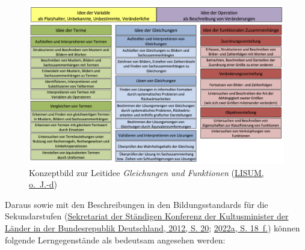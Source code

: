 \documentclass[
]{scrbook}
\theoremstyle{definition}
\theoremstyle{definition}
\theoremstyle{definition}
\theoremstyle{definition}
\theoremstyle{remark}
\begin{document}
\begin{figure}

{\centering \includegraphics[width=0.9\linewidth]{pictures/13-KonzeptFunktion} 

}

\caption{Konzeptbild zur Leitidee \emph{Gleichungen und Funktionen} (\protect\hyperlink{ref-LISUMd}{LISUM, o.~J.-d})}\label{fig:KonzeptFunktionen}
\end{figure}

Daraus sowie mit den Beschreibungen in den Bildungsstandards für die Sekundarstufen (\protect\hyperlink{ref-KMK:2012}{Sekretariat der Ständigen Konferenz der Kultusminister der Länder in der Bundesrepublik Deutschland, 2012, S. 20}; \protect\hyperlink{ref-SekretariatderStandigenKonferenzderKultusministerderLanderinderBundesrepublikDeutschland2022}{2022a, S. 18~f.}) können folgende Lerngegenstände als bedeutsam angesehen werden:
\end{document}

